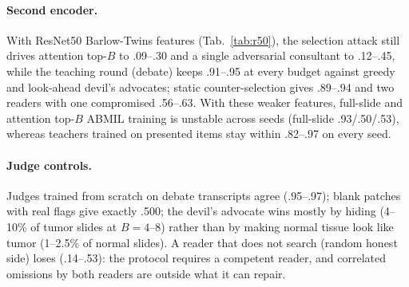 \documentclass[10pt,twocolumn,letterpaper]{article}
\begin{document}
\begin{table}[t]\centering\small
\caption{\textbf{Second encoder} (CAMELYON16, ResNet50 Barlow-Twins features on the same patches; BA mean$\pm$sd, 3 seeds). Full-slide ABMIL: .93 / .50 / .53 per seed.}\label{tab:r50}
\setlength{\tabcolsep}{3pt}
\end{table}
\paragraph{Second encoder.} With ResNet50 Barlow-Twins features (Tab.~\ref{tab:r50}), the selection attack still drives attention top-$B$ to .09--.30 and a single adversarial consultant to .12--.45, while the teaching round (debate) keeps .91--.95 at every budget against greedy and look-ahead devil's advocates; static counter-selection gives .89--.94 and two readers with one compromised .56--.63. With these weaker features, full-slide and attention top-$B$ ABMIL training is unstable across seeds (full-slide .93/.50/.53), whereas teachers trained on presented items stay within .82--.97 on every seed.

\paragraph{Judge controls.} Judges trained from scratch on debate transcripts agree (.95--.97); blank patches with real flags give exactly .500; the devil's advocate wins mostly by hiding (4--10\% of tumor slides at $B{=}4$--8) rather than by making normal tissue look like tumor (1--2.5\% of normal slides). A reader that does not search (random honest side) loses (.14--.53): the protocol requires a competent reader, and correlated omissions by both readers are outside what it can repair.
\end{document}
